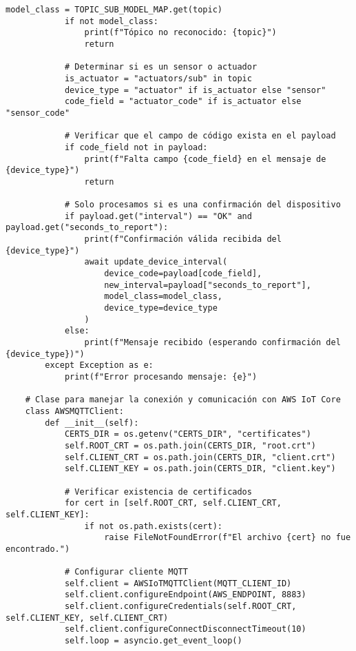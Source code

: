 \begin{lstlisting}[label=cod:mqtt_connection,caption=Definición de Clase para cliente MQTT., language=PythonUTF8]
            model_class = TOPIC_SUB_MODEL_MAP.get(topic)
            if not model_class:
                print(f"Tópico no reconocido: {topic}")
                return

            # Determinar si es un sensor o actuador
            is_actuator = "actuators/sub" in topic
            device_type = "actuator" if is_actuator else "sensor"
            code_field = "actuator_code" if is_actuator else "sensor_code"
            
            # Verificar que el campo de código exista en el payload
            if code_field not in payload:
                print(f"Falta campo {code_field} en el mensaje de {device_type}")
                return

            # Solo procesamos si es una confirmación del dispositivo
            if payload.get("interval") == "OK" and payload.get("seconds_to_report"):
                print(f"Confirmación válida recibida del {device_type}")
                await update_device_interval(
                    device_code=payload[code_field],
                    new_interval=payload["seconds_to_report"],
                    model_class=model_class,
                    device_type=device_type
                )
            else:
                print(f"Mensaje recibido (esperando confirmación del {device_type})")
        except Exception as e:
            print(f"Error procesando mensaje: {e}")
                
    # Clase para manejar la conexión y comunicación con AWS IoT Core
    class AWSMQTTClient:
        def __init__(self):
            CERTS_DIR = os.getenv("CERTS_DIR", "certificates")
            self.ROOT_CRT = os.path.join(CERTS_DIR, "root.crt")
            self.CLIENT_CRT = os.path.join(CERTS_DIR, "client.crt")
            self.CLIENT_KEY = os.path.join(CERTS_DIR, "client.key")

            # Verificar existencia de certificados
            for cert in [self.ROOT_CRT, self.CLIENT_CRT, self.CLIENT_KEY]:
                if not os.path.exists(cert):
                    raise FileNotFoundError(f"El archivo {cert} no fue encontrado.")

            # Configurar cliente MQTT
            self.client = AWSIoTMQTTClient(MQTT_CLIENT_ID)
            self.client.configureEndpoint(AWS_ENDPOINT, 8883)
            self.client.configureCredentials(self.ROOT_CRT, self.CLIENT_KEY, self.CLIENT_CRT)
            self.client.configureConnectDisconnectTimeout(10)
            self.loop = asyncio.get_event_loop()


\end{lstlisting}
